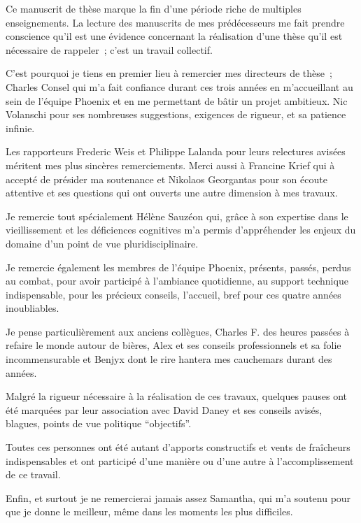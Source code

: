 \begin{small}
Ce manuscrit de thèse marque la fin d'une période riche de multiples enseignements. 
La lecture des manuscrits de mes prédécesseurs me fait prendre conscience qu'il est une évidence concernant la réalisation d'une thèse qu'il est nécessaire de rappeler~; c'est un travail collectif. %

C'est pourquoi je tiens en premier lieu à remercier mes directeurs de thèse~; \mbox{Charles} \mbox{Consel} qui m'a fait confiance durant ces trois années en m'accueillant au sein de l'équipe Phoenix et en me permettant de bâtir un projet ambitieux. \mbox{Nic} \mbox{Volanschi} pour ses nombreuses suggestions, exigences de rigueur, et sa patience infinie. %

Les rapporteurs \mbox{Frederic} \mbox{Weis} et \mbox{Philippe} \mbox{Lalanda} pour leurs relectures avisées méritent mes plus sincères remerciements. Merci aussi à \mbox{Francine} \mbox{Krief} qui à accepté de présider ma soutenance et \mbox{Nikolaos} \mbox{Georgantas} pour son écoute attentive et ses questions qui ont ouverts une autre dimension à mes travaux. %

Je remercie tout spécialement \mbox{Hélène} \mbox{Sauzéon} qui, grâce à son expertise dans le vieillissement et les déficiences cognitives m'a permis d'appréhender les enjeux du domaine d'un point de vue pluridisciplinaire. %

Je remercie également les membres de l'équipe Phoenix, présents, passés, perdus au combat, pour avoir participé à l'ambiance quotidienne, au support technique indispensable, pour les précieux conseils, l'accueil, bref pour ces quatre années inoubliables. %

Je pense particulièrement aux anciens collègues, \mbox{Charles} \mbox{F.} des heures passées à refaire le monde autour de bières, \mbox{Alex} et ses conseils professionnels et sa folie incommensurable et \mbox{Benjyx} dont le rire hantera mes cauchemars durant des années.  %

Malgré la rigueur nécessaire à la réalisation de ces travaux, quelques pauses ont été marquées par leur association avec \mbox{David} \mbox{Daney} et ses conseils avisés, blagues, points de vue politique ``objectifs''. %

Toutes ces personnes ont été autant d'apports constructifs et vents de fraîcheurs indispensables et ont participé d'une manière ou d'une autre à l'accomplissement de ce travail. %

Enfin, et surtout je ne remercierai jamais assez Samantha, qui m'a soutenu pour que je donne le meilleur, même dans les moments les plus difficiles.

\end{small}

